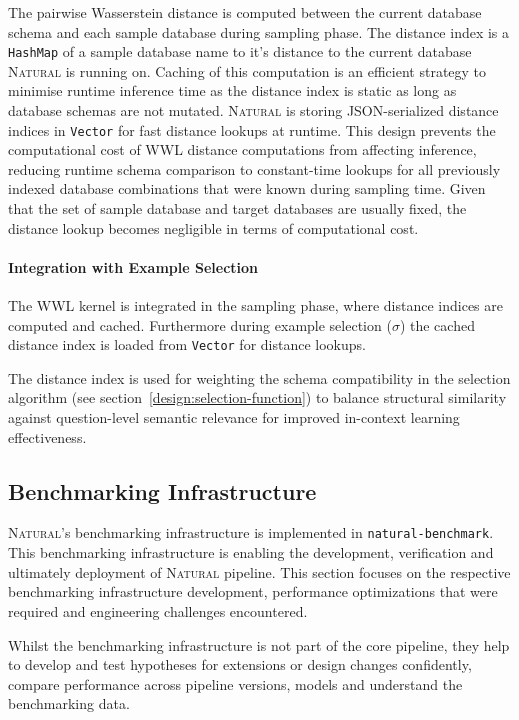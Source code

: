 The pairwise Wasserstein distance is computed between the current database
schema and each sample database during sampling phase. The distance index is
a \texttt{HashMap} of a sample database name to it's distance to the current
database \textsc{Natural} is running on. Caching of this computation is an
efficient strategy to minimise runtime inference time as the distance index is
static as long as database schemas are not mutated. \textsc{Natural} is storing
JSON-serialized distance indices in \texttt{Vector} for fast distance lookups
at runtime. This design prevents the computational cost of WWL distance
computations from affecting inference, reducing runtime schema comparison to
constant-time lookups for all previously indexed database combinations that
were known during sampling time. Given that the set of sample database and
target databases are usually fixed, the distance lookup becomes negligible in
terms of computational cost.

\paragraph{Integration with Example Selection}

The WWL kernel is integrated in the sampling phase, where distance indices are
computed and cached. Furthermore during example selection ($\sigma$) the
cached distance index is loaded from \texttt{Vector} for distance lookups.

The distance index is used for weighting the schema compatibility in the
selection algorithm (see section~\ref{design:selection-function}) to balance
structural similarity against question-level semantic relevance for improved
in-context learning effectiveness.

\subsection{Benchmarking Infrastructure}

\textsc{Natural}'s benchmarking infrastructure is implemented in
\texttt{natural-benchmark}. This benchmarking infrastructure is enabling the
development, verification and ultimately deployment of \textsc{Natural}
pipeline. This section focuses on the respective benchmarking infrastructure
development, performance optimizations that were required and engineering
challenges encountered. 

Whilst the benchmarking infrastructure is not part of the core pipeline, they
help to develop and test hypotheses for extensions or design changes
confidently, compare performance across pipeline versions, models and
understand the benchmarking data.
